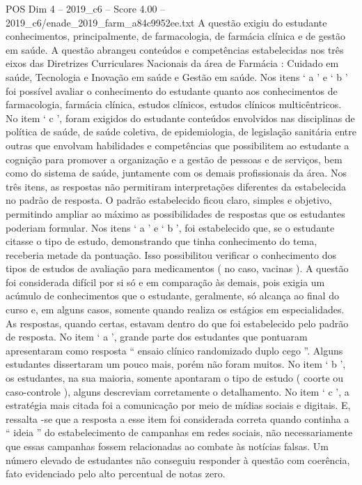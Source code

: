 \begin{textsample}{POS Dim 4 – 2019\_c6 – Score 4.00 – 2019\_c6/enade\_2019\_farm\_a84c9952ee.txt}
A questão exigiu do estudante conhecimentos, principalmente, de farmacologia, de farmácia clínica e de gestão em saúde.
A questão abrangeu conteúdos e competências estabelecidas nos três eixos das Diretrizes Curriculares Nacionais da área de Farmácia : Cuidado em saúde, Tecnologia e Inovação em saúde e Gestão em saúde.
Nos itens ‘ a ’ e ‘ b ’ foi possível avaliar o conhecimento do estudante quanto aos conhecimentos de farmacologia, farmácia clínica, estudos clínicos, estudos clínicos multicêntricos.
No item ‘ c ’, foram exigidos do estudante conteúdos envolvidos nas disciplinas de política de saúde, de saúde coletiva, de epidemiologia, de legislação sanitária entre outras que envolvam habilidades e competências que possibilitem ao estudante a cognição para promover a organização e a gestão de pessoas e de serviços, bem como do sistema de saúde, juntamente com os demais profissionais da área.
Nos três itens, as respostas não permitiram interpretações diferentes da estabelecida no padrão de resposta.
O padrão estabelecido ficou claro, simples e objetivo, permitindo ampliar ao máximo as possibilidades de respostas que os estudantes poderiam formular.
Nos itens ‘ a ’ e ‘ b ’, foi estabelecido que, se o estudante citasse o tipo de estudo, demonstrando que tinha conhecimento do tema, receberia metade da pontuação.
Isso possibilitou verificar o conhecimento dos tipos de estudos de avaliação para medicamentos ( no caso, vacinas ).
A questão foi considerada difícil por si só e em comparação às demais, pois exigia um acúmulo de conhecimentos que o estudante, geralmente, só alcança ao final do curso e, em alguns casos, somente quando realiza os estágios em especialidades.
As respostas, quando certas, estavam dentro do que foi estabelecido pelo padrão de resposta.
No item ‘ a ’, grande parte dos estudantes que pontuaram apresentaram como resposta “ ensaio clínico randomizado duplo cego ”.
Alguns estudantes dissertaram um pouco mais, porém não foram muitos.
No item ‘ b ’, os estudantes, na sua maioria, somente apontaram o tipo de estudo ( coorte ou caso-controle ), alguns descreviam corretamente o detalhamento.
No item ‘ c ’, a estratégia mais citada foi a comunicação por meio de mídias sociais e digitais.
E, ressalta -se que a resposta a esse item foi considerada correta quando continha a “ ideia ” do estabelecimento de campanhas em redes sociais, não necessariamente que essas campanhas fossem relacionadas ao combate às notícias falsas.
Um número elevado de estudantes não conseguiu responder à questão com coerência, fato evidenciado pelo alto percentual de notas zero.

\end{textsample}
